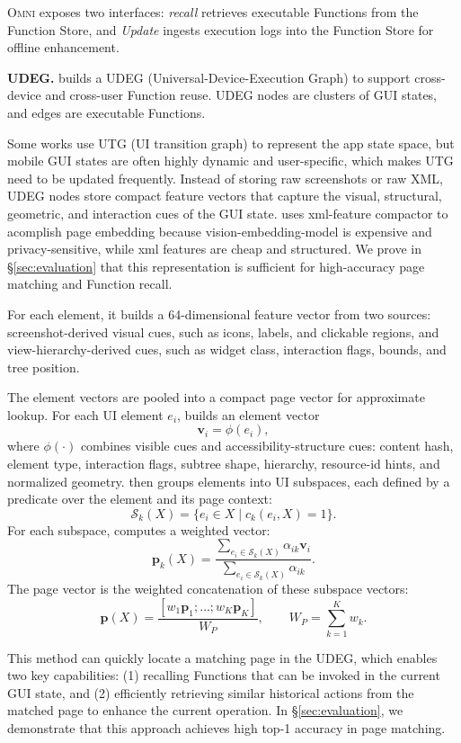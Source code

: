 \textsc{Omni} exposes two interfaces: \emph{recall} retrieves executable Functions from the Function Store, and \emph{Update} ingests execution logs into the Function Store for offline enhancement.

\textbf{UDEG.} \sysname builds a UDEG (Universal-Device-Execution Graph) to support cross-device and cross-user Function reuse. UDEG nodes are clusters of GUI states, and edges are executable Functions.

Some works use UTG (UI transition graph) to represent the app state space, but mobile GUI states are often highly dynamic and user-specific, which makes UTG need to be updated frequently. Instead of storing raw screenshots or raw XML, UDEG nodes store compact feature vectors that capture the visual, structural, geometric, and interaction cues of the GUI state. \sysname uses xml-feature compactor to acomplish page embedding because vision-embedding-model is expensive and privacy-sensitive, while xml features are cheap and structured. We prove in \S\ref{sec:evaluation} that this representation is sufficient for high-accuracy page matching and Function recall.

For each element, it builds a 64-dimensional feature vector from two sources:
screenshot-derived visual cues, such as icons, labels, and clickable regions, and view-hierarchy-derived cues, such as widget class, interaction flags, bounds, and tree position.

The element vectors are pooled into a compact page vector for approximate lookup.
For each UI element $e_i$, \sysname builds an element vector
\[
  \mathbf{v}_i=\phi(e_i),
\]
where $\phi(\cdot)$ combines visible cues and accessibility-structure cues:
content hash, element type, interaction flags, subtree shape, hierarchy,
resource-id hints, and normalized geometry.
\sysname then groups elements into UI subspaces, each defined by a
predicate over the element and its page context:
\[
  \mathcal{S}_k(X)=\{e_i \in X \mid c_k(e_i,X)=1\}.
\]
For each subspace, \sysname computes a weighted vector:
\[
  \mathbf{p}_k(X)=
  \frac{\sum_{e_i\in \mathcal{S}_k(X)} \alpha_{ik}\mathbf{v}_i}
       {\sum_{e_i\in \mathcal{S}_k(X)} \alpha_{ik}}.
\]
The page vector is the weighted concatenation of these subspace vectors:
\[
  \mathbf{p}(X)=
  \frac{[w_1\mathbf{p}_1;\ldots;w_K\mathbf{p}_K]}{W_P},
  \qquad
  W_P=\sum_{k=1}^{K}w_k .
\]

This method can quickly locate a matching page in the UDEG, which enables two key capabilities: (1) recalling Functions that can be invoked in the current GUI state, and (2) efficiently retrieving similar historical actions from the matched page to enhance the current operation. In \S\ref{sec:evaluation}, we demonstrate that this approach achieves high top-1 accuracy in page matching.

